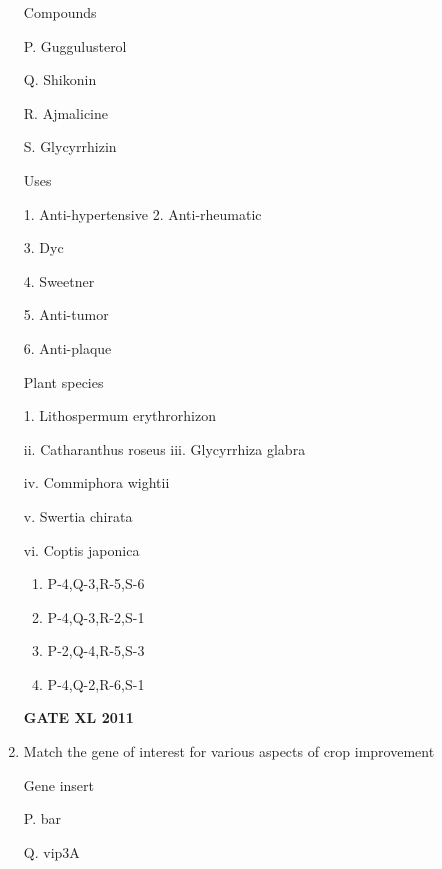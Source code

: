 \documentclass[journal,12pt,onecolumn]{IEEEtran}
\begin{document}
\begin{enumerate}
\begin{minipage}{0.3\textwidth}
\begin{flushleft}
Compounds

P. Guggulusterol

Q. Shikonin

R. Ajmalicine

S. Glycyrrhizin


		\end{flushleft}
		\end{minipage}
		\begin{minipage}{0.3\textwidth}
		\begin{flushleft}

Uses

1. Anti-hypertensive
2. Anti-rheumatic

3. Dyc

4. Sweetner

5. Anti-tumor

6. Anti-plaque
		\end{flushleft}
		\end{minipage}
		\begin{minipage}{0.5\textwidth}
		\begin{flushleft}
Plant species


1. Lithospermum erythrorhizon

ii. Catharanthus roseus
iii. Glycyrrhiza glabra

iv. Commiphora wightii

v. Swertia chirata

vi. Coptis japonica

		\end{flushleft}
		\end{minipage}
	
		\begin{enumerate}
			\item P-4,Q-3,R-5,S-6
			\item P-4,Q-3,R-2,S-1
			\item P-2,Q-4,R-5,S-3
			\item P-4,Q-2,R-6,S-1
		\end{enumerate}
		\hfill{\textbf{GATE XL 2011}}

\item{Match the gene of interest for various aspects of crop improvement}
	

	\begin{minipage}{0.5\textwidth}
	\begin{flushleft}

Gene insert

P. bar

Q. vip3A


\end{flushleft}
\end{minipage}
\end{enumerate}
\end{document}
